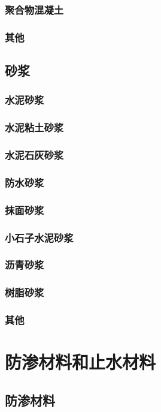 \documentclass[UTF8]{../../ApplicationUniverse}
\begin{document}
        \subsubsection{聚合物混凝土}
        \subsubsection{其他}
    \subsection{砂浆}
        \subsubsection{水泥砂浆}
        \subsubsection{水泥粘土砂浆}
        \subsubsection{水泥石灰砂浆}
        \subsubsection{防水砂浆}
        \subsubsection{抹面砂浆}
        \subsubsection{小石子水泥砂浆}
        \subsubsection{沥青砂浆}
        \subsubsection{树脂砂浆}
        \subsubsection{其他}
\section{防渗材料和止水材料}
    \subsection{防渗材料}
\end{document}
